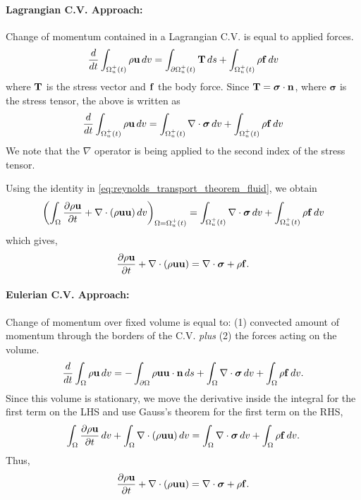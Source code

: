 \documentclass[oneside,a4paper,11pt]{report}
\begin{document}
\paragraph{Lagrangian C.V. Approach:}
Change of momentum contained in a Lagrangian C.V. is equal to applied forces.
\begin{equation}
\frac{d}{dt}\int_{\Omega^+_u(t)} \rho \mathbf{u} \, dv = \int_{\partial \Omega^+_u(t)} \mathbf{T}\,ds + \int_{\Omega^+_u(t)} \rho \mathbf{f} \,dv
\end{equation}
where $\mathbf{T}$ is the stress vector and $\mathbf{f}$ the body force. Since $\mathbf{T} = \boldsymbol{\sigma} \cdot \mathbf{n}$, where $\boldsymbol{\sigma}$ is the stress tensor, the above is written as
\begin{equation}
\frac{d}{dt}\int_{\Omega^+_u(t)} \rho \mathbf{u} \, dv = \int_{\Omega^+_u(t)} \nabla \cdot \boldsymbol{\sigma} \,dv + \int_{\Omega^+_u(t)} \rho \mathbf{f} \,dv
\end{equation}
We note that the $\nabla$ operator is being applied to the second index of the stress tensor.

Using the identity in \cref{eq:reynolds_transport_theorem_fluid}, we obtain
\begin{equation}
\left ( \int_{\Omega} \frac{\partial \rho\mathbf{u}}{\partial t} +\nabla\cdot(\rho \mathbf{u} \mathbf{u})\,dv \right)_{\Omega = \Omega^+_u(t)} = \int_{\Omega^+_u(t)} \nabla \cdot \boldsymbol{\sigma} \,dv + \int_{\Omega^+_u(t)} \rho \mathbf{f} \,dv
\end{equation}
which gives,
\begin{equation}
\frac{\partial \rho\mathbf{u} }{\partial t} +\nabla\cdot(\rho\mathbf{u} \mathbf{u}) = \nabla\cdot \boldsymbol{\sigma} +\rho \mathbf{f}.
\end{equation}

\paragraph{Eulerian C.V. Approach:}
Change of momentum over fixed volume is equal to: (1) convected amount of momentum through the borders of the C.V. \textit{plus} (2) the forces acting on the volume.
\begin{equation}
\frac{d}{dt}\int_\Omega \rho \mathbf{u} \,dv=-\int_{\partial \Omega} \rho \mathbf{u} \mathbf{u} \cdot \mathbf{n} \, ds + \int_{\Omega} \nabla \cdot \boldsymbol{\sigma} \,dv + \int_{\Omega} \rho \mathbf{f} \,dv.
\end{equation}
Since this volume is stationary, we move the derivative inside the integral for the first term on the LHS and use Gauss's theorem for the first term on the RHS,
\begin{eqnarray}
\int_\Omega \frac{\partial \rho \mathbf{u}}{\partial t}\,dv+\int_\Omega \nabla\cdot(\rho\mathbf{u} \mathbf{u})\,dv = \int_\Omega \nabla\cdot \boldsymbol{\sigma} \,dv + \int_\Omega \rho \mathbf{f} \,dv .
\end{eqnarray}
Thus,
\begin{equation}
\frac{\partial \rho\mathbf{u} }{\partial t} + \nabla \cdot (\rho \mathbf{u} \mathbf{u} ) =  \nabla\cdot \boldsymbol{\sigma} + \rho \mathbf{f}.
\end{equation}
\end{document}
